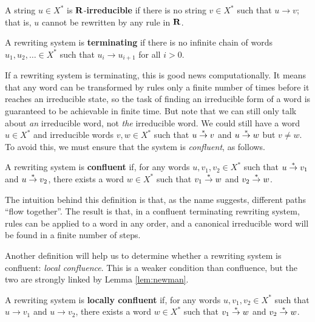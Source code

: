 \begin{definition}
  A string $u \in X^*$ is $\mathbf{R}$-\textbf{irreducible} if there is no
  string $v \in X^*$ such that $u \to v$; that is, $u$ cannot be rewritten by
  any rule in $\mathbf{R}$.  \cite[Def~12.13]{cgt}
\end{definition}

\begin{definition}
  A rewriting system is \textbf{terminating} if there is no infinite chain of
  words $u_1, u_2, \ldots \in X^*$ such that $u_i \to u_{i+1}$ for all $i > 0$.
\end{definition}

If a rewriting system is terminating, this is good news computationally.  It
means that any word can be transformed by rules only a finite number of times
before it reaches an irreducible state, so the task of finding an irreducible
form of a word is guaranteed to be achievable in finite time.  But note that we
can still only talk about \textit{an} irreducible word, not \textit{the}
irreducible word.  We could still have a word $u \in X^*$ and irreducible words
$v, w \in X^*$ such that $u \stackrel{*}{\to} v$ and $u \stackrel{*}{\to} w$ but $v \neq w$.
To avoid this, we must ensure that the system is \textit{confluent}, as follows.

\begin{definition}
  A rewriting system is \textbf{confluent} if, for any words $u,v_1,v_2 \in X^*$
  such that $u \stackrel{*}{\to} v_1$ and $u \stackrel{*}{\to} v_2$, there exists a word $w \in X^*$
  such that $v_1 \stackrel{*}{\to} w$ and $v_2 \stackrel{*}{\to} w$.
\end{definition}

The intuition behind this definition is that, as the name suggests, different
paths ``flow together''.  The result is that, in a confluent terminating
rewriting system, rules can be applied to a word in any order, and a canonical
irreducible word will be found in a finite number of steps.

Another definition will help us to determine whether a rewriting system is
confluent: \textit{local confluence}.  This is a weaker condition than
confluence, but the two are strongly linked by Lemma \ref{lem:newman}.


\begin{definition}
  A rewriting system is \textbf{locally confluent} if, for any words
  $u,v_1,v_2 \in X^*$ such that $u \to v_1$ and $u \to v_2$, there exists a word
  $w \in X^*$ such that $v_1 \stackrel{*}{\to} w$ and $v_2 \stackrel{*}{\to} w$.
\end{definition}

